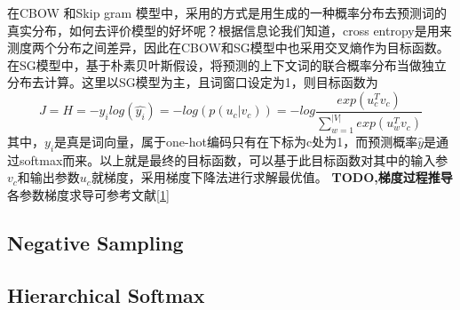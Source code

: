 \documentclass[twoside,nofonts,fancyhdr,openany,UTF8]{ctexbook}
\begin{document}
在CBOW 和Skip gram 模型中，采用的方式是用生成的一种概率分布去预测词的真实分布，如何去评价模型的好坏呢？根据信息论我们知道，cross entropy是用来测度两个分布之间差异，因此在CBOW和SG模型中也采用交叉熵作为目标函数。在SG模型中，基于朴素贝叶斯假设，将预测的上下文词的联合概率分布当做独立分布去计算。这里以SG模型为主，且词窗口设定为1，则目标函数为
$$J = H = -y_{i}log(\widehat{y_{i}}) = -log(p(u_{c}|v_c)) = -log\frac{exp(u_{c}^{T}v_{c})}{\sum_{w=1}^{|V|}exp(u_{w}^{T}v_{c})}$$
其中，$y_i$是真是词向量，属于one-hot编码只有在下标为c处为1，而预测概率$\widehat{y}$是通过softmax而来。以上就是最终的目标函数，可以基于此目标函数对其中的输入参$v_{c}$和输出参数$u_{c}$就梯度，采用梯度下降法进行求解最优值。
\textbf{TODO,梯度过程推导}各参数梯度求导可参考文献\href{http://shomy.top/2017/07/28/word2vec-all/}{[1]}


\subsection{Negative Sampling}

\subsection{Hierarchical Softmax}
\end{document}

